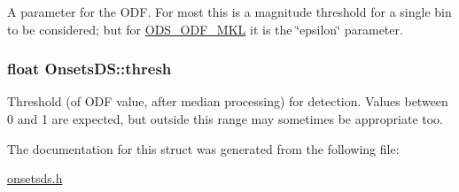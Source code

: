 \-A parameter for the \-O\-D\-F. \-For most this is a magnitude threshold for a single bin to be considered; but for \hyperlink{onsetsds_8h_a09065a442711dbed773c9cfdd7140103ad6e3eef08abfa4438b15c7e4844101a4}{\-O\-D\-S\-\_\-\-O\-D\-F\-\_\-\-M\-K\-L} it is the \char`\"{}epsilon\char`\"{} parameter. \hypertarget{structOnsetsDS_a9303e0d0a909db24d327259ec4317e98}{
\subsubsection[{thresh}]{\setlength{\rightskip}{0pt plus 5cm}float {\bf \-Onsets\-D\-S\-::thresh}}}\label{structOnsetsDS_a9303e0d0a909db24d327259ec4317e98}
\-Threshold (of \-O\-D\-F value, after median processing) for detection. \-Values between 0 and 1 are expected, but outside this range may sometimes be appropriate too. 

\-The documentation for this struct was generated from the following file\-:\begin{DoxyCompactItemize}
\item 
\hyperlink{onsetsds_8h}{onsetsds.\-h}\end{DoxyCompactItemize}
